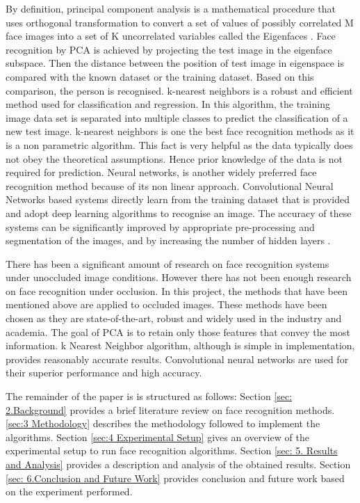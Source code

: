 \documentclass[conference]{IEEEtran}
\begin{document}
\vspace{0.5mm}
By definition, principal component analysis is a mathematical procedure that uses orthogonal transformation to convert a set of values of possibly correlated M face images into a set of K uncorrelated variables called the Eigenfaces
\cite{turk1991face}. Face recognition by PCA is achieved by projecting the test image in the eigenface subspace. Then the distance between the position of test image in eigenspace is compared with the known dataset or the training dataset. Based on this comparison, the person is recognised. k-nearest neighbors is a robust and efficient method used for classification and regression. In this algorithm, the training image data set is separated into multiple classes to predict the classification of a new test image. k-nearest neighbors is one the best face recognition methods as it is a non parametric algorithm. This fact is very helpful as the data typically does not obey the theoretical assumptions. Hence prior knowledge of the data is not required for prediction. Neural networks, is another widely preferred face recognition method because of its non linear approach. Convolutional Neural Networks based systems directly learn from the training dataset that is provided and adopt deep learning algorithms to recognise an image. The accuracy of these systems can be significantly improved by appropriate pre-processing and segmentation of the images, and by increasing the number of hidden layers \cite{dean2012large}.


There has been a significant amount of research on face recognition systems under unoccluded image conditions. However there has not been enough research on face recognition under occlusion. In this project, the methods that have been mentioned above are applied to occluded images. These methods have been chosen as they are state-of-the-art, robust and widely used in the industry and academia. The goal of PCA is to retain only those features that convey the most information\cite{turk1991face}. k Nearest Neighbor algorithm, although is simple in implementation, provides reasonably accurate results\cite{zhang2007ml}. Convolutional neural networks are used for their superior performance and high accuracy\cite{lawrence1997face}.



The remainder of the paper is is structured as follows: Section \ref{sec: 2.Background} provides a brief literature review on face recognition methods. \ref{sec:3 Methodology} describes the methodology followed to implement the algorithms. Section \ref{sec:4 Experimental Setup} gives an overview of the experimental setup to run face recognition algorithms. Section \ref{sec: 5. Results and Analysis} provides a description and analysis of the obtained results. Section \ref{sec: 6.Conclusion and Future Work} provides conclusion and future work based on the experiment performed.
\end{document}
